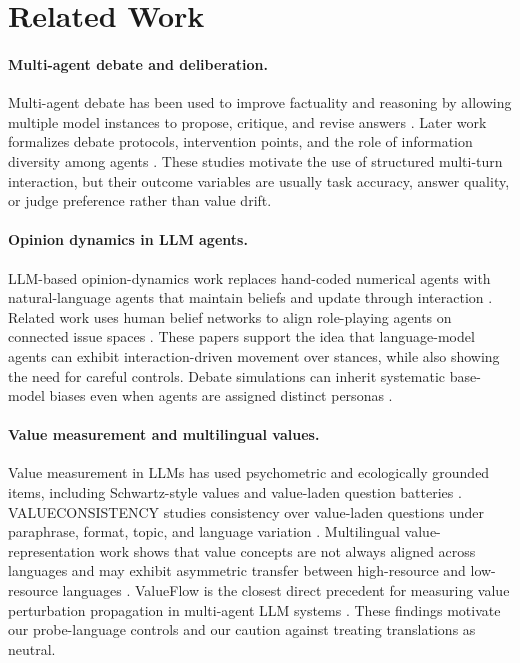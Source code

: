 \documentclass{article}
\begin{document}
\section{Related Work}

\paragraph{Multi-agent debate and deliberation.}
Multi-agent debate has been used to improve factuality and reasoning by allowing multiple model instances to propose, critique, and revise answers \citep{du2024multiagentdebate}. Later work formalizes debate protocols, intervention points, and the role of information diversity among agents \citep{liang2024multillmdebate}. These studies motivate the use of structured multi-turn interaction, but their outcome variables are usually task accuracy, answer quality, or judge preference rather than value drift.

\paragraph{Opinion dynamics in LLM agents.}
LLM-based opinion-dynamics work replaces hand-coded numerical agents with natural-language agents that maintain beliefs and update through interaction \citep{chuang2024opiniondynamics}. Related work uses human belief networks to align role-playing agents on connected issue spaces \citep{chuang2024beliefnetworks}. These papers support the idea that language-model agents can exhibit interaction-driven movement over stances, while also showing the need for careful controls. Debate simulations can inherit systematic base-model biases even when agents are assigned distinct personas \citep{frisch2024debatebias}.

\paragraph{Value measurement and multilingual values.}
Value measurement in LLMs has used psychometric and ecologically grounded items, including Schwartz-style values and value-laden question batteries \citep{anonymous2025psychometricvalues}. VALUECONSISTENCY studies consistency over value-laden questions under paraphrase, format, topic, and language variation \citep{li2024valueconsistency}. Multilingual value-representation work shows that value concepts are not always aligned across languages and may exhibit asymmetric transfer between high-resource and low-resource languages \citep{xu2024multilingualvalues}. ValueFlow is the closest direct precedent for measuring value perturbation propagation in multi-agent LLM systems \citep{valueflow2026}. These findings motivate our probe-language controls and our caution against treating translations as neutral.
\end{document}
